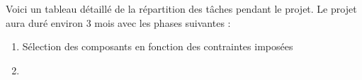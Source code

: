 Voici un tableau détaillé de la répartition des tâches pendant le projet.
Le projet aura duré environ 3 mois avec les phases suivantes :
\begin{enumerate}
    \item Sélection des composants en fonction des contraintes imposées
    \item 
\end{enumerate}

